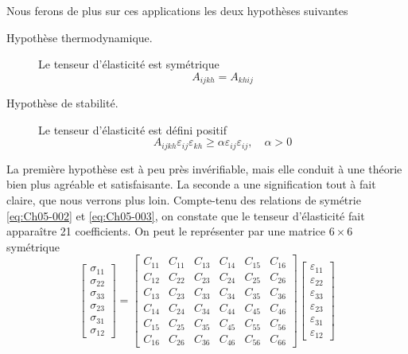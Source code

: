 Nous ferons de plus sur ces applications les deux hypothèses suivantes
\begin{description}
    \item[Hypothèse thermodynamique.] Le tenseur d'élasticité est symétrique
        \begin{equation}
            A_{ijkh} = A_{khij}
            \label{eq:Ch05-003}
        \end{equation}
    \item[Hypothèse de stabilité.] Le tenseur d'élasticité est défini positif
        \begin{equation}
            A_{ijkh} \varepsilon_{ij} \varepsilon_{kh} \geq \alpha \varepsilon_{ij} \varepsilon_{ij}, \quad \alpha > 0
            \label{eq:Ch05-004}
        \end{equation}
\end{description}

La première hypothèse est à peu près invérifiable, mais elle conduit à une théorie bien plus agréable et satisfaisante.
La seconde a une signification tout à fait claire, que nous verrons plus loin.
Compte-tenu des relations de symétrie \eqref{eq:Ch05-002} et \eqref{eq:Ch05-003}, on constate que le tenseur d'élasticité fait apparaître 21 coefficients.
On peut le représenter par une matrice $6\times6$ symétrique
\begin{equation}
    \begin{bmatrix}
        \sigma_{11}\\
        \sigma_{22}\\
        \sigma_{33}\\
        \sigma_{23}\\
        \sigma_{31}\\
        \sigma_{12}
    \end{bmatrix}
    =
    \begin{bmatrix}
        C_{11} & C_{11} & C_{13} & C_{14} & C_{15} & C_{16} \\
        C_{12} & C_{22} & C_{23} & C_{24} & C_{25} & C_{26} \\
        C_{13} & C_{23} & C_{33} & C_{34} & C_{35} & C_{36} \\
        C_{14} & C_{24} & C_{34} & C_{44} & C_{45} & C_{46} \\
        C_{15} & C_{25} & C_{35} & C_{45} & C_{55} & C_{56} \\
        C_{16} & C_{26} & C_{36} & C_{46} & C_{56} & C_{66}
    \end{bmatrix}
    \begin{bmatrix}
        \varepsilon_{11}\\
        \varepsilon_{22}\\
        \varepsilon_{33}\\
        \varepsilon_{23}\\
        \varepsilon_{31}\\
        \varepsilon_{12}
    \end{bmatrix}
    \label{eq:Ch05-005}
\end{equation}

